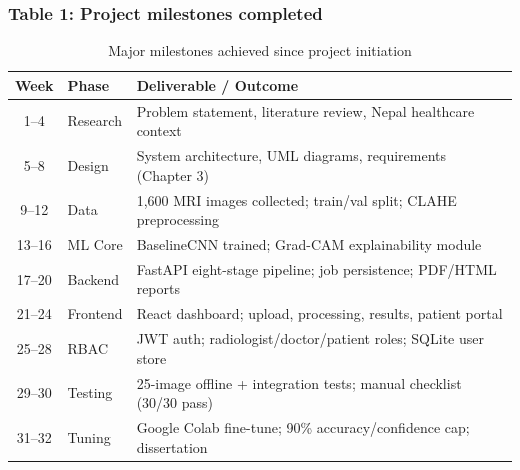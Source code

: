 \documentclass[11pt,a4paper]{article}
\begin{document}
\subsubsection{Table 1: Project milestones completed}
\begin{table}[H]
\centering
\caption{Major milestones achieved since project initiation}
\label{tab:milestones}
\small
\begin{tabular}{|c|l|p{9.5cm}|}
\hline
\textbf{Week} & \textbf{Phase} & \textbf{Deliverable / Outcome} \\
\hline
1--4   & Research  & Problem statement, literature review, Nepal healthcare context \\
\hline
5--8   & Design    & System architecture, UML diagrams, requirements (Chapter 3) \\
\hline
9--12  & Data      & 1{,}600 MRI images collected; train/val split; CLAHE preprocessing \\
\hline
13--16 & ML Core   & BaselineCNN trained; Grad-CAM explainability module \\
\hline
17--20 & Backend   & FastAPI eight-stage pipeline; job persistence; PDF/HTML reports \\
\hline
21--24 & Frontend  & React dashboard; upload, processing, results, patient portal \\
\hline
25--28 & RBAC      & JWT auth; radiologist/doctor/patient roles; SQLite user store \\
\hline
29--30 & Testing   & 25-image offline + integration tests; manual checklist (30/30 pass) \\
\hline
31--32 & Tuning    & Google Colab fine-tune; 90\% accuracy/confidence cap; dissertation \\
\hline
\end{tabular}
\end{table}
\end{document}
